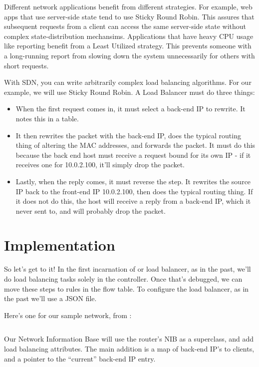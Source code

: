 Different network applications benefit from different strategies.  For example, web apps that
use server-side state tend to use Sticky Round Robin.  This assures that subsequent requests
from a client can access the same server-side state without complex state-distribution 
mechansims.  Applications that have heavy CPU usage like reporting benefit from a Least Utilized
strategy.  This prevents someone with a long-running report from slowing down the system 
unnecessarily for others with short requests.

With SDN, you can write arbitrarily complex load balancing algorithms.  For our example,
we will use Sticky Round Robin.  A Load Balancer must do three things:

\begin{itemize}
\item When the first request comes in, it must select a back-end IP to rewrite.  It notes this
in a table.
\item It then rewrites the packet with the back-end IP, does the typical routing thing of 
altering the MAC addresses, and forwards the packet.  It must do this because the back end host
must receive a request bound for its own IP - if it receives one for 10.0.2.100, it'll simply drop
the packet.
\item Lastly, when the reply comes, it must reverse the step.  It rewrites the source IP back to 
the front-end IP 10.0.2.100, then does the typical routing thing.   If it does not do this, the 
host will receive a reply from a back-end IP, which it never sent to, and will probably drop
the packet.  
\end{itemize}

\section{Implementation}

So let's get to it!  In the first incarnation of or load balancer, as in the past, we'll 
do load balancing tasks solely in the controller.  Once that's debugged, we can move these
steps to rules in the flow table.  To configure the load balancer, as in the past
we'll use a JSON file.  

Here's one for our sample network, from :

\inputminted{python}{code/routing_variants/load_balancer.json}

Our Network Information Base will use the router's NIB as a 
superclass, and add load balancing attributes.   The main addition is a map of back-end IP's
to clients, and a pointer to the ``current'' back-end IP entry.  

